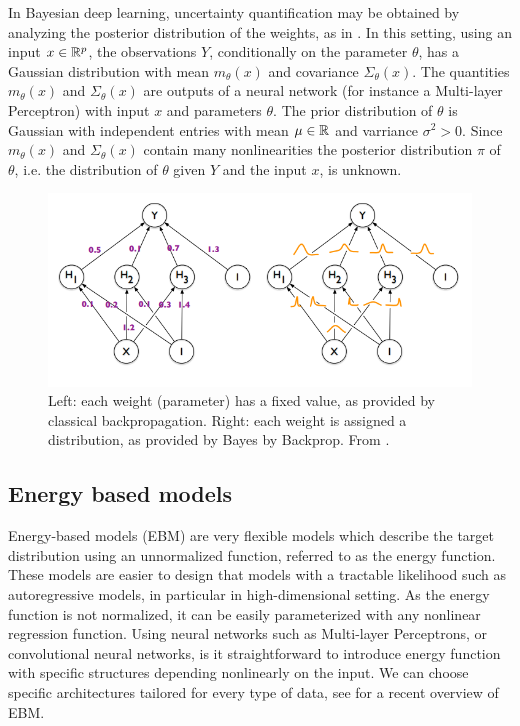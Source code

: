 \documentclass[english,graybox,envcountchap,envcountsame,sectrefs,shortlabels]{svmono}
\theoremstyle{style}
\begin{document}
\begin{example}
In Bayesian deep learning, uncertainty quantification may be obtained by analyzing the posterior distribution of the weights, as in \cite{blundell2015weight}. In this setting, using an input $x\in \mathbb{R}^p$, the observations $Y$, conditionally on the parameter $\theta$, has a Gaussian distribution with mean $m_\theta(x)$ and covariance $\Sigma_\theta(x)$. The quantities  $m_\theta(x)$ and  $\Sigma_\theta(x)$ are outputs of a neural network (for instance a Multi-layer Perceptron) with input $x$ and parameters $\theta$. The prior distribution of $\theta$ is Gaussian with independent entries with mean $\mu \in\mathbb{R}$ and varriance $\sigma^2>0$. Since $m_\theta(x)$ and  $\Sigma_\theta(x)$ contain many nonlinearities the posterior distribution $\pi$ of $\theta$, i.e. the distribution of $\theta$ given $Y$ and the input $x$, is unknown.
\begin{figure}
\centering
\includegraphics[scale = .8]{bayesbybackprop.png}
\caption{Left: each weight (parameter) has a fixed value, as provided by classical backpropagation. Right: each weight is assigned a distribution, as provided by Bayes by Backprop. From \cite{blundell2015weight}.
}
\label{fig:bayesbybackprop}
\end{figure}
\end{example}


\subsection{Energy based models}
Energy-based models (EBM) are very flexible models which describe the target distribution using an unnormalized function, referred to as the energy function. These models are easier to design that models with a tractable likelihood such as autoregressive models, in particular in high-dimensional setting. As the energy function is not normalized, it can
be easily parameterized with any nonlinear regression function. Using neural networks such as Multi-layer Perceptrons, or convolutional neural networks, is it straightforward to introduce energy function with specific structures depending nonlinearly on the input. We can choose specific
architectures tailored for every type of data, see \cite{song2021train} for a recent overview of EBM.
\end{document}
